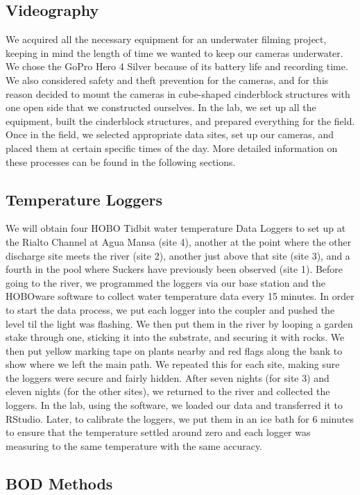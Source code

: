 \documentclass{article}\usepackage[]{graphicx}\usepackage[]{color}
\begin{document}
\subsection{Videography}

We acquired all the necessary equipment for an underwater filming project, keeping in mind the length of time we wanted to keep our cameras underwater. We chose the GoPro Hero 4 Silver because of its battery life and recording time. We also considered safety and theft prevention for the cameras, and for this reason decided to mount the cameras in cube-shaped cinderblock structures with one open side that we constructed ourselves. In the lab, we set up all the equipment, built the cinderblock structures, and prepared everything for the field. Once in the field, we selected appropriate data sites, set up our cameras, and placed them at certain specific times of the day. More detailed information on these processes can be found in the following sections.

\subsection{Temperature Loggers}
We will obtain four HOBO Tidbit water temperature Data Loggers to set up at the Rialto Channel at Agua Mansa (site 4), another at the point where the other discharge site meets the river (site 2), another just above that site (site 3), and a fourth in the pool where Suckers have previously been observed (site 1). Before going to the river, we programmed the loggers via our base station and the HOBOware software to collect water temperature data every 15 minutes. In order to start the data process, we put each logger into the coupler and pushed the level til the light was flashing. We then put them in the river by looping a garden stake through one, sticking it into the substrate, and securing it with rocks. We then put yellow marking tape on plants nearby and red flags along the bank to show where we left the main path. We repeated this for each site, making sure the loggers were secure and fairly hidden. After seven nights (for site 3) and eleven nights (for the other sites), we returned to the river and collected the loggers. In the lab, using the software, we loaded our data and transferred it to RStudio. Later, to calibrate the loggers, we put them in an ice bath for 6 minutes to ensure that the temperature settled around zero and each logger was measuring to the same temperature with the same accuracy.

\subsection{BOD Methods}
\end{document}
